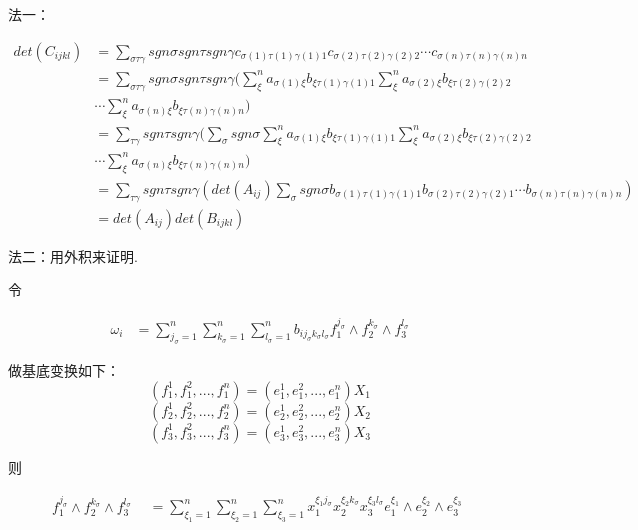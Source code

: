\documentclass{amsc}          %
\numberwithin{equation}{section} %
\begin{document}
\begin{prof}

法一：

\begin{align*}
det(C_{ijkl})&=\sum \limits_{\sigma\tau\gamma}sgn\sigma sgn\tau sgn\gamma c_{\sigma(1)\tau(1)\gamma(1)1} c_{\sigma(2)\tau(2)\gamma(2)2}\cdots c_{\sigma(n)\tau(n)\gamma(n)n}\\
&=\sum \limits_{\sigma\tau\gamma}sgn\sigma sgn\tau sgn\gamma (\sum_{\xi}^{n}a_{\sigma(1)\xi}b_{\xi \tau(1)\gamma(1)1} \sum_{\xi}^{n}a_{\sigma(2)\xi}b_{\xi \tau(2)\gamma(2)2} \\ &\cdots\sum_{\xi}^{n}a_{\sigma(n)\xi}b_{\xi \tau(n)\gamma(n)n})\\
&=\sum \limits_{\tau\gamma}sgn\tau sgn\gamma(\sum \limits_{\sigma}sgn\sigma  \sum_{\xi}^{n}a_{\sigma(1)\xi}b_{\xi \tau(1)\gamma(1)1} \sum_{\xi}^{n}a_{\sigma(2)\xi}b_{\xi \tau(2)\gamma(2)2} \\
&\cdots \sum_{\xi}^{n}a_{\sigma(n)\xi}b_{\xi \tau(n)\gamma(n)n})\\
&=\sum \limits_{\tau\gamma}sgn\tau sgn\gamma(det(A_{ij})\sum \limits_{\sigma}sgn\sigma b_{\sigma(1) \tau(1)\gamma(1)1} b_{\sigma(2) \tau(2)\gamma(2)1} \cdots b_{\sigma(n) \tau(n)\gamma(n)n})\\
&=det(A_{ij})det(B_{ijkl})
\end{align*}

法二：用外积来证明.

令

\begin{equation}
\begin{aligned}
\omega_{i}
&= \sum_{j_{\sigma}=1}^{n}\sum_{k_{\sigma}=1}^{n}\sum_{l_{\sigma}=1}^{n}b_{ij_{\sigma}k_{\sigma}l_{\sigma}} f_{1}^{j_{\sigma}} \wedge f_{2}^{k_{\sigma}} \wedge f_{3}^{l_{\sigma}}
\end{aligned}
\end{equation}

做基底变换如下：
$$(f_{1}^{1},f_{1}^{2},...,f_{1}^{n})=(e_{1}^{1},e_{1}^{2},...,e_{1}^{n})X_{1}$$
$$(f_{2}^{1},f_{2}^{2},...,f_{2}^{n})=(e_{2}^{1},e_{2}^{2},...,e_{2}^{n})X_{2}$$
$$(f_{3}^{1},f_{3}^{2},...,f_{3}^{n})=(e_{3}^{1},e_{3}^{2},...,e_{3}^{n})X_{3}$$

则

\begin{equation}
f_{1}^{j_{\sigma}}\wedge f_{2}^{k_{\sigma}}\wedge f_{3}^{l_{\sigma}}
\begin{aligned}
& = \sum_{\xi_{1}=1}^{n}\sum_{\xi_{2}=1}^{n}\sum_{\xi_{3}=1}^{n}x_{1}^{\xi_{1}j_{\sigma}}x_{2}^{\xi_{2}k_{\sigma}}x_{3}^{\xi_{
3}l_{\sigma}}e_{1}^{\xi_{1}}\wedge e_{2}^{\xi_{2}}\wedge e_{3}^{\xi_{3}}
\end{aligned}
\end{equation}


\end{prof}
\end{document}

